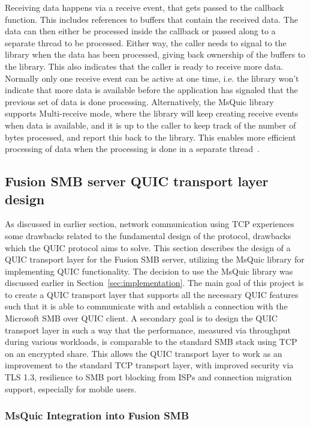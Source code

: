 \documentclass[english, 12pt, a4paper, elec, utf8, a-2b, online]{aaltothesis}
\begin{document}
Receiving data happens via a receive event, that gets passed to the callback function.
This includes references to buffers that contain the received data. The data can
then either be processed inside the callback or passed along to a separate
thread to be processed. Either way, the caller needs to signal to the library when
the data has been processed, giving back ownership of the buffers to the library. This
also indicates that the caller is ready to receive more data. Normally only one receive
event can be active at one time, i.e. the library won't indicate that more data is
available before the application has signaled that the previous set of data is
done processing. Alternatively, the MsQuic library supports Multi-receive mode,
where the library will keep creating receive events when data is available, and
it is up to the caller to keep track of the number of bytes processed, and report
this back to the library. This enables more efficient processing of data when the
processing is done in a separate thread~\cite{msquic_docs}.

\subsection{Fusion SMB server QUIC transport layer design}

As discussed in earlier section, network communication using TCP experiences
some drawbacks related to the fundamental design of the protocol, drawbacks
which the QUIC protocol aims to solve. This section describes the design of a
QUIC transport layer for the Fusion SMB server, utilizing the MsQuic library for
implementing QUIC functionality. The decision to use the MsQuic library was discussed
earlier in Section~\ref{sec:implementation}. The main goal of this project is to create
a QUIC transport layer that supports all the necessary QUIC features such that it
is able to communicate with and establish a connection with the Microsoft SMB over
QUIC client. A secondary goal is to design the QUIC transport layer in such a way
that the performance, measured via throughput during various workloads, is comparable
to the standard SMB stack using TCP on an encrypted share. This allows the QUIC transport
layer to work as an improvement to the standard TCP transport layer, with improved
security via TLS 1.3, resilience to SMB port blocking from ISPs and connection migration
support, especially for mobile users.

\subsubsection{MsQuic Integration into Fusion SMB}
\end{document}
